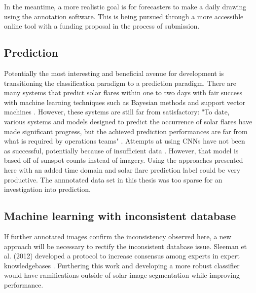 \documentclass[twoside]{report}
\begin{document}
In the meantime, a more realistic goal is for forecasters to make a daily drawing using the annotation software. This is being pursued through a more accessible online tool with a funding proposal in the process of submission. 

\subsection{Prediction}
Potentially the most interesting and beneficial avenue for development is transitioning the classification paradigm to a prediction paradigm. There are many systems that predict solar flares within one to two days with fair success with machine learning techniques such as Bayesian methods \cite{predict1} and support vector machines \cite{predict2}. However, these systems are still far from satisfactory: "To date, various systems and models designed to predict the occurrence of solar flares have made significant progress, but the achieved prediction performances are far from what is required by operations teams" \cite{predict3}. Attempts at using CNNs have not been as successful, potentially because of insufficient data \cite{predict4}. However, that model is based off of sunspot counts instead of imagery. Using the approaches presented here with an added time domain and solar flare prediction label could be very productive. The annnotated data set in this thesis was too sparse for an investigation into prediction. 

\subsection{Machine learning with inconsistent database}
If further annotated images confirm the inconsistency observed here, a new approach will be necessary to rectify the inconsistent database issue. Sleeman et al. (2012) developed a protocol to increase consensus among experts in expert knowledgebases \cite{sleeman}. Furthering this work and developing a more robust classifier would have ramifications outside of solar image segmentation while improving performance. 



\end{document}
